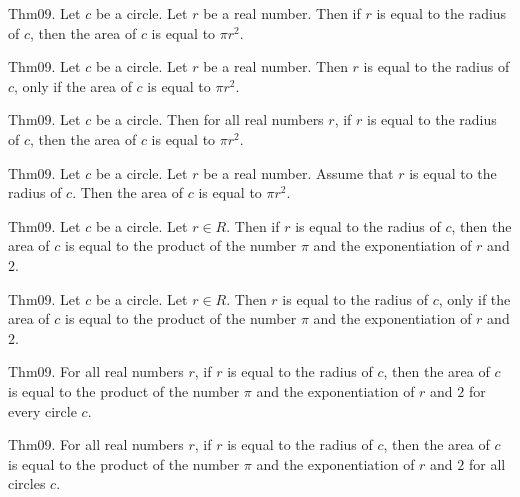 \documentclass{article}
\begin{document}
Thm09. Let $c$ be a circle. Let $r$ be a real number. Then if $r$ is equal to the radius of $c$, then the area of $c$ is equal to $\pi r ^ {2}$.

Thm09. Let $c$ be a circle. Let $r$ be a real number. Then $r$ is equal to the radius of $c$, only if the area of $c$ is equal to $\pi r ^ {2}$.

Thm09. Let $c$ be a circle. Then for all real numbers $r$, if $r$ is equal to the radius of $c$, then the area of $c$ is equal to $\pi r ^ {2}$.

Thm09. Let $c$ be a circle. Let $r$ be a real number. Assume that $r$ is equal to the radius of $c$. Then the area of $c$ is equal to $\pi r ^ {2}$.

Thm09. Let $c$ be a circle. Let $r \in R$. Then if $r$ is equal to the radius of $c$, then the area of $c$ is equal to the product of the number \(\pi\) and the exponentiation of $r$ and $2$.

Thm09. Let $c$ be a circle. Let $r \in R$. Then $r$ is equal to the radius of $c$, only if the area of $c$ is equal to the product of the number \(\pi\) and the exponentiation of $r$ and $2$.

Thm09. For all real numbers $r$, if $r$ is equal to the radius of $c$, then the area of $c$ is equal to the product of the number \(\pi\) and the exponentiation of $r$ and $2$ for every circle $c$.

Thm09. For all real numbers $r$, if $r$ is equal to the radius of $c$, then the area of $c$ is equal to the product of the number \(\pi\) and the exponentiation of $r$ and $2$ for all circles $c$.
\end{document}
